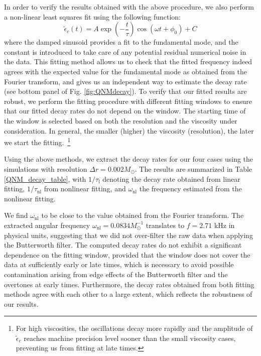 \documentclass[prd,aps,twocolumn,floats,floatfix,nofootinbib,superscriptaddress] {revtex4-1}
\begin{document}
In order to verify the results obtained with the above procedure, we also perform a non-linear least squares fit using the following function: 
\begin{equation}
    \tilde{\epsilon}_c(t) = A \exp\left(-\frac{t}{\tau}\right)\cos(\omega t+\phi_0)+C
\end{equation}
where the damped sinusoid provides a fit to the fundamental mode, and the constant is introduced to take care of any potential residual numerical noise in the data.
This fitting method allows us to check that the fitted frequency indeed agrees with the expected value for the fundamental mode as obtained from the Fourier transform, and gives us an independent way to estimate the decay rate
(see bottom panel of Fig. \ref{fig:QNMdecay}).  To verify that our fitted results are robust, we perform the fitting procedure with different fitting windows to ensure that our fitted decay rates do not depend on the window.  The starting time of the window is selected based on both the resolution and the viscosity under consideration.  In general, the smaller (higher) the viscosity (resolution), the later we start the fitting.~\footnote{For high viscosities, the oscillations decay more rapidly and the amplitude of $\tilde{\epsilon}_c$ reaches machine precision level sooner than the small viscosity cases, preventing us from fitting at late times.}

Using the above methods, we extract the decay rates for our four cases using the simulations with resolution $\Delta r=0.002 M_\odot$.  The results are summarized in Table \ref{QNM_decay_table}, with $1/{\tau}_\text{l}$ denoting the decay rate obtained from linear fitting, $1/{\tau}_\text{nl}$ from nonlinear fitting, and $\omega_{\text{nl}}$ the frequency estimated from the nonlinear fitting.  

We find $\omega_{\text{nl}}$ to be close to the value obtained from the Fourier transform. The extracted angular frequency $\omega_{\text{nl}}=0.0834 M_\odot^{-1}$ translates to $f=2.71$ kHz in physical units, suggesting that we did not over-filter the raw data when applying the Butterworth filter.  The computed decay rates do not exhibit a significant dependence on the fitting window, provided that the window does not cover the data at sufficiently early or late times, which is necessary to avoid possible contamination  arising from edge effects of the Butterworth filter and the overtones at early times.  Furthermore, the decay rates obtained from both fitting methods agree with each other to a large extent, which reflects the robustness of our results.\\
\end{document}
